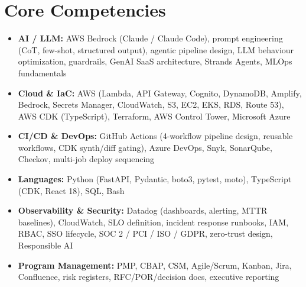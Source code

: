 \documentclass[11pt,a4paper,sans]{moderncv}
\begin{document}

\section{Core Competencies}
\vspace{1pt}
\begin{itemize}

\item \textbf{AI / LLM:} AWS Bedrock (Claude / Claude Code), prompt engineering (CoT, few-shot, structured output), agentic pipeline design, LLM behaviour optimization, guardrails, GenAI SaaS architecture, Strands Agents, MLOps fundamentals

\item \textbf{Cloud \& IaC:} AWS (Lambda, API Gateway, Cognito, DynamoDB, Amplify, Bedrock, Secrets Manager, CloudWatch, S3, EC2, EKS, RDS, Route 53), AWS CDK (TypeScript), Terraform, AWS Control Tower, Microsoft Azure

\item \textbf{CI/CD \& DevOps:} GitHub Actions (4-workflow pipeline design, reusable workflows, CDK synth/diff gating), Azure DevOps, Snyk, SonarQube, Checkov, multi-job deploy sequencing

\item \textbf{Languages:} Python (FastAPI, Pydantic, boto3, pytest, moto), TypeScript (CDK, React 18), SQL, Bash

\item \textbf{Observability \& Security:} Datadog (dashboards, alerting, MTTR baselines), CloudWatch, SLO definition, incident response runbooks, IAM, RBAC, SSO lifecycle, SOC 2 / PCI / ISO / GDPR, zero-trust design, Responsible AI

\item \textbf{Program Management:} PMP, CBAP, CSM, Agile/Scrum, Kanban, Jira, Confluence, risk registers, RFC/POR/decision docs, executive reporting

\end{itemize}

\end{document}
